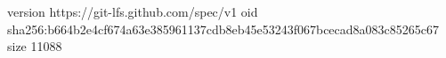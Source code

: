 version https://git-lfs.github.com/spec/v1
oid sha256:b664b2e4cf674a63e385961137cdb8eb45e53243f067bcecad8a083c85265c67
size 11088

